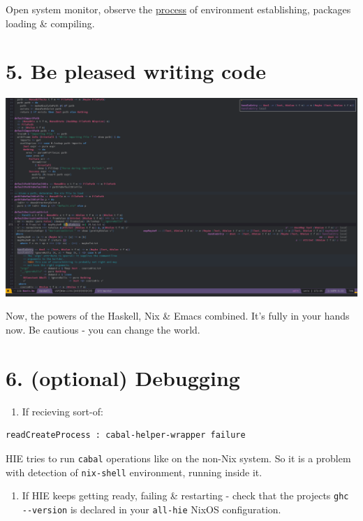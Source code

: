 \documentclass[a4paper,14pt,oneside]{book}
\begin{document}
{Open system monitor, observe the \hyperref[orgada3bb8]{process} of environment establishing, packages loading \& compiling.\\

\section{5. Be pleased writing code}
\label{sec:org918a084}

\begin{center}
\includegraphics[width=.9\linewidth]{images/Screenshot_20190727_134446.png}
\end{center}

Now, the powers of the Haskell, Nix \& Emacs combined. It's fully in your hands now. Be cautious - you can change the world.\\

\section{6. (optional) Debugging}
\label{sec:org8f1c29f}

\begin{enumerate}
\item If recieving sort-of:\\
\end{enumerate}

\begin{verbatim}
readCreateProcess : cabal-helper-wrapper failure
\end{verbatim}

HIE tries to run \texttt{cabal} operations like on the non-Nix system. So it is a problem with detection of \texttt{nix-shell} environment, running inside it.\\

\begin{enumerate}
\item If HIE keeps getting ready, failing \& restarting - check that the projects \texttt{ghc -{}-version} is declared in your \texttt{all-hie} NixOS configuration.\\
\end{enumerate}

}
\end{document}
